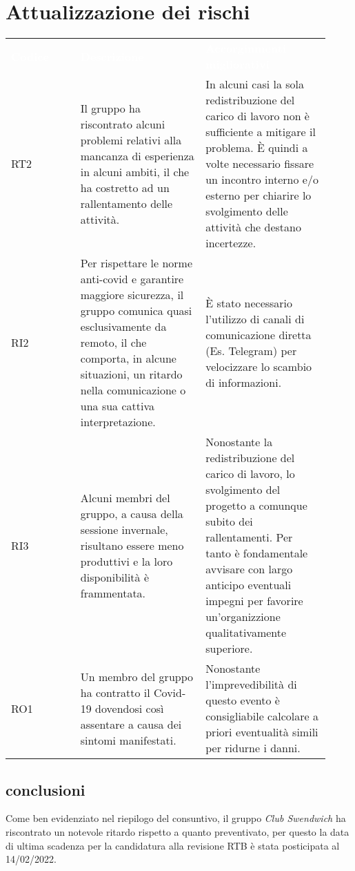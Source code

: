 \section{Attualizzazione dei rischi}
\label{sec:AttualizzazioneRischi}

{\renewcommand{\arraystretch}{1.5} \small
\begin{tabular}{ >{\centering}p{0.20\linewidth} | >{\centering}p{0.36\linewidth} | >{\centering}p{0.36\linewidth}}
	\rowcolor[RGB]{33, 73, 50}
	\textcolor{white}{\textbf{Codice}} & \textcolor{white}
	{\textbf{Descrizione}} & \textcolor{white}{\textbf{Accorginmenti migliorativi}}\tabularnewline
	\rowcolor[RGB]{216, 235, 171}
	RT2
    & Il gruppo ha riscontrato alcuni problemi relativi alla mancanza di esperienza in alcuni ambiti, il che ha costretto ad un rallentamento delle attività.  
    & In alcuni casi la sola redistribuzione del carico di lavoro non è sufficiente a mitigare il problema. È quindi a volte necessario fissare un incontro interno e/o esterno per chiarire lo svolgimento delle attività che destano incertezze.   \tabularnewline
    \rowcolor[RGB]{233, 245, 206}
	RI2
    & Per rispettare le norme anti-covid e garantire maggiore sicurezza, il gruppo comunica quasi esclusivamente da remoto, il che comporta, in alcune situazioni, un ritardo nella comunicazione o una sua cattiva interpretazione.
    & È stato necessario l'utilizzo di canali di comunicazione diretta (Es. Telegram) per velocizzare lo scambio di informazioni. \tabularnewline
    \rowcolor[RGB]{216, 235, 171}
    RI3
	& Alcuni membri del gruppo, a causa della sessione invernale, risultano essere meno produttivi e la loro disponibilità è frammentata. 
    & Nonostante la redistribuzione del carico di lavoro, lo svolgimento del progetto a comunque subito dei rallentamenti. Per tanto è fondamentale avvisare con largo anticipo eventuali impegni per favorire un'organizzione qualitativamente superiore.  \tabularnewline
	\rowcolor[RGB]{233, 245, 206}
    RO1
	& Un membro del gruppo ha contratto il Covid-19 dovendosi così assentare a causa dei sintomi manifestati.
    & Nonostante l'imprevedibilità di questo evento è consigliabile calcolare a priori eventualità simili per ridurne i danni.   \tabularnewline
\end{tabular}	
}

\subsection{conclusioni}
Come ben evidenziato nel riepilogo del consuntivo, il gruppo \textit{Club Swendwich} ha riscontrato un notevole ritardo rispetto a quanto preventivato, per questo la data di ultima scadenza 
per la candidatura alla revisione RTB è stata posticipata al 14/02/2022.

